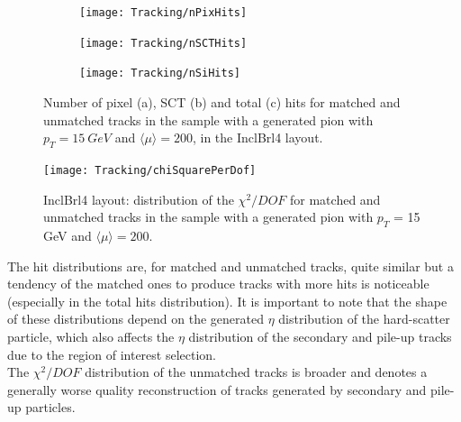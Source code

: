 \documentclass[a4paper,twoside,12pt]{book}
\begin{document}
\begin{figure}
\begin{subfigure}{\linewidth}
\centering
\texttt{[image: Tracking/nPixHits]}
\caption{}
\label{fig:tracking:nPixHits}
\end{subfigure}

\begin{subfigure}{\linewidth}
\centering
\texttt{[image: Tracking/nSCTHits]}
\caption{}
\label{fig:tracking:nSCTHits}
\end{subfigure}

\begin{subfigure}{\linewidth}
\centering
\texttt{[image: Tracking/nSiHits]}
\caption{}
\label{fig:tracking:nSiHits}
\end{subfigure}
\caption{Number of pixel (a), SCT (b) and total (c) hits for matched and unmatched tracks in the sample with a generated pion with $p_{T} = 15\ GeV$ and $\langle\mu\rangle = 200$, in the InclBrl4 layout.}
\label{fig:tracking:nHits}
\end{figure}

\begin{figure}
\centering
\texttt{[image: Tracking/chiSquarePerDof]}
\caption{InclBrl4 layout: distribution of the $\chi^2/DOF$ for matched and unmatched tracks in the sample with a generated pion with $p_{T}$ = 15 GeV and $\langle\mu\rangle = 200$.}
\label{fig:tracking:chiSquare}
\end{figure}

The hit distributions are, for matched and unmatched tracks, quite similar but a tendency of the matched ones to produce tracks with more hits is noticeable (especially in the total hits distribution). It is important to note that the shape of these distributions depend on the generated $\eta$ distribution of the hard-scatter particle, which
also affects the $\eta$ distribution of the secondary and pile-up tracks due to the region of interest selection. \\

The $\chi^2/DOF$ distribution of the unmatched tracks is broader and denotes a generally worse quality reconstruction of tracks generated by secondary and pile-up particles. \\
\end{document}
